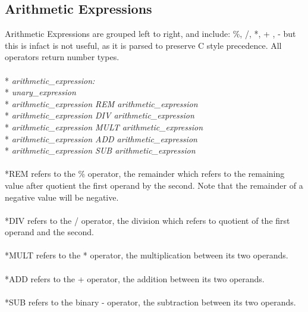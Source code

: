 \documentclass[11pt]{article}
\newcommand{\tab}{\hspace*{2em}}
\begin{document}
\subsection{Arithmetic Expressions}
Arithmetic Expressions are grouped left to right, and include: \%, /, *, + , - but this is infact is not useful, as it is parsed to preserve C style precedence. All operators return number types.
\\ \\* \tab \emph{arithmetic\_expression:}
\\* \tab \tab \emph{unary\_expression}
\\* \tab \tab \emph{arithmetic\_expression REM arithmetic\_expression}
\\* \tab \tab \emph{arithmetic\_expression DIV arithmetic\_expression}
\\* \tab \tab \emph{arithmetic\_expression MULT arithmetic\_expression}
\\* \tab \tab \emph{arithmetic\_expression ADD arithmetic\_expression}
\\* \tab \tab \emph{arithmetic\_expression SUB arithmetic\_expression}
\\ \\*REM refers to the \% operator, the remainder which refers to the remaining value after quotient the first operand by the second. Note that the remainder of a negative value will be negative.
\\ \\*DIV refers to the / operator, the division which refers to quotient of the first operand and the second.
\\ \\*MULT refers to the * operator, the multiplication between its two operands.
\\ \\*ADD refers to the + operator, the addition between its two operands.
\\ \\*SUB refers to the binary - operator, the subtraction between its two operands.
\end{document}
